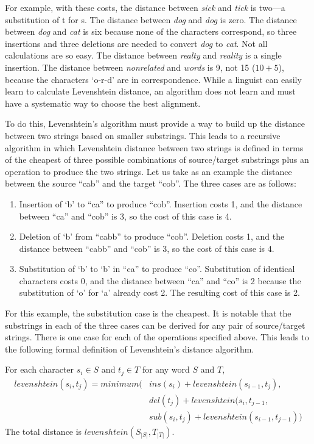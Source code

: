 \documentclass[11pt]{article}
\begin{document}
For example, with these costs, the distance between \textit{sick} and
\textit{tick} is two---a substitution of t for s. The distance between
\textit{dog} and \textit{dog} is zero. The distance between
\textit{dog} and \textit{cat} is six because none of the characters
correspond, so three insertions and three deletions are needed to
convert \textit{dog} to \textit{cat}. Not all calculations are so
easy. The distance between \textit{realty} and \textit{reality} is a
single insertion. The distance between \textit{nonrelated} and
\textit{words} is 9, not 15 ($10 + 5$), because the characters `o-r-d'
are in correspondence. While a linguist can easily learn to calculate Levenshtein
distance, an algorithm does not learn and must have a systematic way
to choose the best alignment.

To do this, Levenshtein's algorithm must provide a way to build up
the distance between two strings based on smaller substrings.
This leads to a recursive algorithm in which Levenshtein distance
between two strings is defined in terms of the cheapest of three
possible combinations of source/target substrings plus an operation to
produce the two strings. Let us take as an example the distance
between the source ``cab'' and the target ``cob''. The three cases are
as follows:

\begin{enumerate}
\item Insertion of `b' to ``ca'' to produce
``cob''. Insertion costs 1, and the distance between ``ca'' and
``cob'' is 3, so the cost of this case is 4.
\item Deletion of `b' from ``cabb'' to produce ``cob''. Deletion costs
  1, and the distance between ``cabb'' and ``cob'' is 3, so the cost
  of this case is 4.
\item Substitution of `b' to `b' in ``ca'' to produce
  ``co''. Substitution of identical characters costs 0, and the distance
  between ``ca'' and ``co'' is 2 because the substitution of `o' for
  `a' already cost 2. The resulting cost of this case is 2.
\end{enumerate}

For this example, the substitution case is the cheapest. It is notable
that the substrings in each of the three cases can be derived for any
pair of source/target strings. There is one case for each of the
operations specified above. This leads to the following formal
definition of Levenshtein's distance algorithm.

For each character $s_i \in S$ and $t_j \in T$ for any word $S$ and $T$,
\[ \begin{array}{rl}
 levenshtein(s_i,t_j) = minimum( & ins(s_i)+levenshtein(s_{i-1},t_j),\\
& del(t_j)+levenshtein(s_i,t_{j-1}, \\
& sub(s_i,t_j)+levenshtein(s_{i-1},t_{j-1}))
   \end{array}
\]
The total distance is $levenshtein(S_{|S|},T_{|T|})$.
\end{document}
